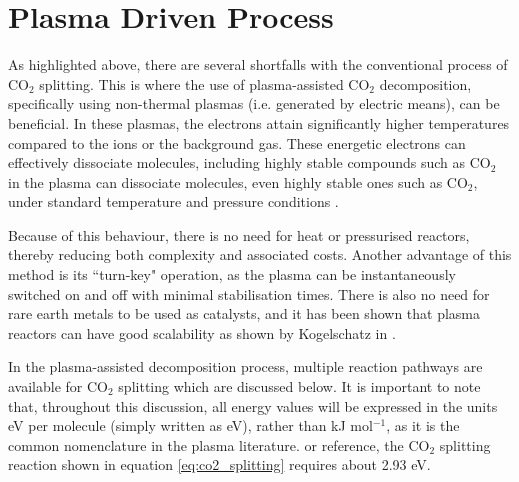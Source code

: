%
%
%
%

\section{Plasma Driven Process}

As highlighted above, there are several shortfalls with the conventional process of CO$_2$ splitting. This is where the use of plasma-assisted CO$_2$ decomposition, specifically using non-thermal plasmas (i.e. generated by electric means), can be beneficial. In these plasmas, the electrons attain significantly higher temperatures compared to the ions or the background gas. These energetic electrons 
can effectively dissociate molecules, including highly stable compounds such as CO$_2$
 in the plasma can dissociate molecules, even highly stable ones such as CO$_2$, under standard temperature and pressure conditions \cite{Snoeckx2017}. 

Because of this behaviour, there is no need for heat or pressurised reactors, thereby reducing both complexity and associated costs. Another advantage of this method is its ``turn-key" operation, as the plasma can be instantaneously switched on and off with minimal stabilisation times. There is also no need for rare earth metals to be used as catalysts, and it has been shown that plasma reactors can have good scalability as shown by Kogelschatz in \cite{kogelschatz_2003}. 

In the plasma-assisted decomposition process, multiple reaction pathways are available for CO$_2$ splitting which are discussed below. It is important to note that, throughout this discussion, all energy values will be expressed in the units eV per molecule (simply written as eV), rather than kJ mol$^{-1}$, as it is the common nomenclature in the plasma literature. or reference, the CO$_2$ splitting reaction shown in equation \ref{eq:co2_splitting} requires about 2.93 eV.

